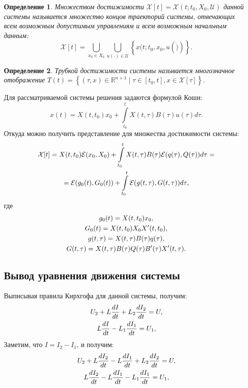 \documentclass[11pt]{article}
\newtheorem{definition}{Определение}
\begin{document}
\begin{definition}
Множеством достижимости $\mathcal{X}[t] = \mathcal{X}(t; t_0, X_0, \mathcal{U})$ данной системы называется множество концов траекторий системы, отвечающих всем возможным допустимым
управлениям и всем возможным начальным данным:
$$
\mathcal{X}[t] = \bigcup\limits_{x_0 \in X_0} \bigcup\limits_{u(\cdot) \in \mathcal{U}} \left\{ x(t; t_0, x_0, u(\dot)) \right\}.
$$
\end{definition}

\begin{definition}
Трубкой достижимости системы называется многозначное отображение $T(t) = \left\{ (\tau, x) \in \mathbb{R}^{n+1} \mid \tau \in [t_0, t], x \in \mathcal{X}[\tau] \right\}$.
\end{definition}

Для рассматриваемой системы решения задаются формулой Коши:
$$
x(t) = X(t, t_0)x_0 + \int\limits_{t_0}^{t} X(t, \tau)B(\tau)u(\tau)d\tau.
$$
Откуда можно получить представление для множества достижимости системы:
\begin{gather}
\mathcal{X}[t] = X(t, t_0)\mathcal{E}(x_0, X_0) + \int\limits_{t_0}^t X(t, \tau)B(\tau)\mathcal{E}(q(\tau), Q(\tau))d\tau = \notag \\
= \mathcal{E}(g_0(t), G_0(t)) + \int\limits_{t_0}^t \mathcal{E}(g(t, \tau), G(t, \tau))d\tau, \notag
\end{gather}
где
\begin{gather}
g_0(t) = X(t, t_0)x_0, \notag \\
G_0(t) = X(t, t_0) X_0 X'(t, t_0), \notag \\
g(t, \tau) = X(t, \tau) B(\tau) q(\tau), \notag \\
G(t, \tau) = X(t, \tau) B(\tau) Q(\tau) B'(\tau) X'(t, \tau). \notag
\end{gather}
\subsection{Вывод уравнения движения системы}
Выписывая правила Кирхгофа для данной системы, получим:
\begin{gather}
U_2 + L\frac{dI}{dt} + L_2\frac{dI_2}{dt} = U, \notag \\
L\frac{dI}{dt} - L_1\frac{dI_1}{dt} = U_1, \notag
\end{gather}
Заметим, что $I=I_2-I_1$, и получим:
\begin{gather}
U_2 + L\frac{dI_2}{dt} - L\frac{dI_1}{dt} + L_2\frac{dI_2}{dt} = U, \notag \\
L\frac{dI_2}{dt} -L\frac{dI_1}{dt} - L_1\frac{dI_1}{dt} = U_1, \notag
\end{gather}
\end{document}
